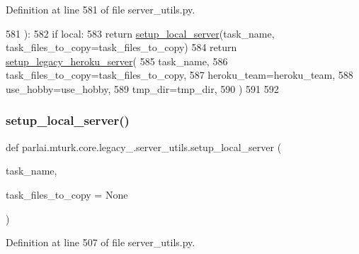 Definition at line 581 of file server\+\_\+utils.\+py.


\begin{DoxyCode}
581 ):
582     \textcolor{keywordflow}{if} local:
583         \textcolor{keywordflow}{return} \hyperlink{namespaceparlai_1_1mturk_1_1core_1_1server__utils_a9d4c4937ea60bd74630a44739e825ebf}{setup\_local\_server}(task\_name, task\_files\_to\_copy=task\_files\_to\_copy)
584     \textcolor{keywordflow}{return} \hyperlink{namespaceparlai_1_1mturk_1_1core_1_1server__utils_adff2f564896069e0b76ae1b007515a2b}{setup\_legacy\_heroku\_server}(
585         task\_name,
586         task\_files\_to\_copy=task\_files\_to\_copy,
587         heroku\_team=heroku\_team,
588         use\_hobby=use\_hobby,
589         tmp\_dir=tmp\_dir,
590     )
591 
592 
\end{DoxyCode}
\mbox{\label{namespaceparlai_1_1mturk_1_1core_1_1legacy__2018_1_1server__utils_a2710ac8519a6de20fcc29417582545e6}} 
\subsubsection{\texorpdfstring{setup\+\_\+local\+\_\+server()}{setup\_local\_server()}}
{\footnotesize\ttfamily def parlai.\+mturk.\+core.\+legacy\+\_.\+server\+\_\+utils.\+setup\+\_\+local\+\_\+server (\begin{DoxyParamCaption}\item[{}]{task\+\_\+name,  }\item[{}]{task\+\_\+files\+\_\+to\+\_\+copy = {\ttfamily None} }\end{DoxyParamCaption})}



Definition at line 507 of file server\+\_\+utils.\+py.


